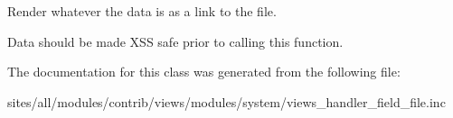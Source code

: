 Render whatever the data is as a link to the file.

Data should be made XSS safe prior to calling this function. 

The documentation for this class was generated from the following file:\begin{CompactItemize}
\item 
sites/all/modules/contrib/views/modules/system/views\_\-handler\_\-field\_\-file.inc\end{CompactItemize}
